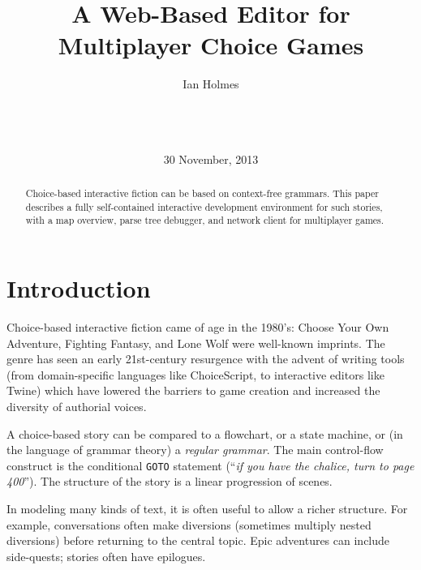 \documentclass{acm_proc_article-sp}
\begin{document}
\title{A Web-Based Editor for Multiplayer Choice Games}
\author{
\alignauthor
Ian Holmes\\
       \\
       \\
       \\
}
\date{30 November, 2013}

\maketitle
\begin{abstract}
Choice-based interactive fiction can be based on context-free grammars.
This paper describes a fully self-contained interactive development environment for such stories,
with a map overview, parse tree debugger, and network client for multiplayer games.
\end{abstract}



\section{Introduction}

Choice-based interactive fiction came of age in the 1980's:
Choose Your Own Adventure, Fighting Fantasy, and Lone Wolf were well-known imprints.
The genre has seen an early 21st-century resurgence with the advent of writing tools
(from domain-specific languages like ChoiceScript, to interactive editors like Twine)
which have lowered the barriers to game creation and increased the diversity of authorial voices.

A choice-based story can be compared to a flowchart, or a state machine,
or (in the language of grammar theory) a {\em regular grammar}.
The main control-flow construct is the conditional {\tt GOTO} statement
(``{\em if you have the chalice, turn to page 400}'').
The structure of the story is a linear progression of scenes.

In modeling many kinds of text, it is often useful to allow a richer structure.
For example, conversations often make diversions (sometimes multiply nested diversions) before returning to the central topic.
Epic adventures can include side-quests; stories often have epilogues.
\end{document}
